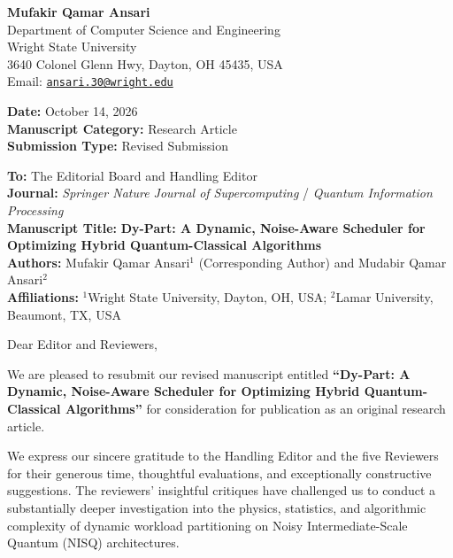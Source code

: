 \documentclass[11pt,a4paper]{article}
\begin{document}
\noindent
\begin{minipage}[t]{0.65\textwidth}
    {\large\textbf{\color{primaryblue}Mufakir Qamar Ansari}}\\[0.2em]
    Department of Computer Science and Engineering\\
    Wright State University\\
    3640 Colonel Glenn Hwy, Dayton, OH 45435, USA\\
    Email: \href{mailto:ansari.30@wright.edu}{\texttt{ansari.30@wright.edu}}
\end{minipage}
\hfill
\begin{minipage}[t]{0.32\textwidth}
    \raggedleft
    \textbf{Date:} October 14, 2026\\[0.2em]
    \textbf{Manuscript Category:} Research Article\\
    \textbf{Submission Type:} Revised Submission
\end{minipage}

\vspace{0.8em}
\noindent{\color{linegray}\rule{\textwidth}{1.2pt}}
\vspace{1.0em}

\noindent
\textbf{To:} The Editorial Board and Handling Editor\\
\textbf{Journal:} \textit{Springer Nature Journal of Supercomputing} / \textit{Quantum Information Processing}\\
\textbf{Manuscript Title:} \textbf{Dy-Part: A Dynamic, Noise-Aware Scheduler for Optimizing Hybrid Quantum-Classical Algorithms}\\
\textbf{Authors:} Mufakir Qamar Ansari$^1$ (Corresponding Author) and Mudabir Qamar Ansari$^2$\\
\textbf{Affiliations:} $^1$Wright State University, Dayton, OH, USA; $^2$Lamar University, Beaumont, TX, USA

\vspace{1.2em}

\noindent Dear Editor and Reviewers,

\vspace{0.6em}
\noindent
We are pleased to resubmit our revised manuscript entitled \textbf{``Dy-Part: A Dynamic, Noise-Aware Scheduler for Optimizing Hybrid Quantum-Classical Algorithms''} for consideration for publication as an original research article.

We express our sincere gratitude to the Handling Editor and the five Reviewers for their generous time, thoughtful evaluations, and exceptionally constructive suggestions. The reviewers' insightful critiques have challenged us to conduct a substantially deeper investigation into the physics, statistics, and algorithmic complexity of dynamic workload partitioning on Noisy Intermediate-Scale Quantum (NISQ) architectures.
\end{document}
